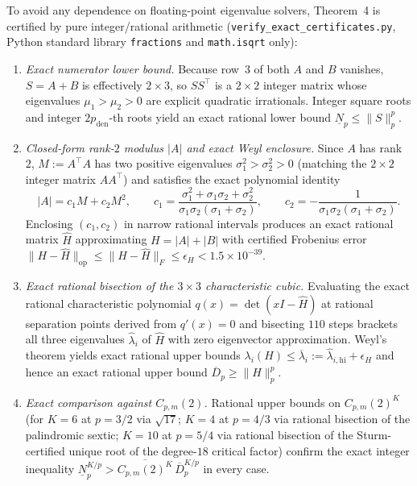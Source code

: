 \documentclass[10pt,letterpaper]{article}
\newcommand{\op}{\mathrm{op}}
\begin{document}
To avoid any dependence on floating-point eigenvalue solvers, Theorem~4 is certified by pure integer/rational arithmetic (\texttt{verify\_exact\_certificates.py}, Python standard library \texttt{fractions} and \texttt{math.isqrt} only):
\begin{enumerate}[leftmargin=1.6em,itemsep=2pt]
  \item \emph{Exact numerator lower bound.} Because row~$3$ of both $A$ and $B$ vanishes, $S = A+B$ is effectively $2\times 3$, so $S S^\top$ is a $2\times 2$ integer matrix whose eigenvalues $\mu_1 > \mu_2 > 0$ are explicit quadratic irrationals. Integer square roots and integer $2p_{\mathrm{den}}$-th roots yield an exact rational lower bound $\underline{N}_p \le \|S\|_p^p$.
  \item \emph{Closed-form rank-$2$ modulus $|A|$ and exact Weyl enclosure.} Since $A$ has rank~$2$, $M := A^\top A$ has two positive eigenvalues $\sigma_1^2 > \sigma_2^2 > 0$ (matching the $2\times 2$ integer matrix $A A^\top$) and satisfies the exact polynomial identity
  \[
    |A| = c_1 M + c_2 M^2, \qquad c_1 = \frac{\sigma_1^2 + \sigma_1\sigma_2 + \sigma_2^2}{\sigma_1\sigma_2(\sigma_1 + \sigma_2)}, \qquad c_2 = -\frac{1}{\sigma_1\sigma_2(\sigma_1 + \sigma_2)}.
  \]
  Enclosing $(c_1, c_2)$ in narrow rational intervals produces an exact rational matrix $\widehat{H}$ approximating $H = |A| + |B|$ with certified Frobenius error $\|H - \widehat{H}\|_{\op} \le \|H - \widehat{H}\|_F \le \epsilon_H < 1.5\times 10^{-39}$.
  \item \emph{Exact rational bisection of the $3\times 3$ characteristic cubic.} Evaluating the exact rational characteristic polynomial $q(x) = \det(xI - \widehat{H})$ at rational separation points derived from $q'(x) = 0$ and bisecting $110$ steps brackets all three eigenvalues $\hat{\lambda}_i$ of $\widehat{H}$ with zero eigenvector approximation. Weyl's theorem yields exact rational upper bounds $\lambda_i(H) \le \overline{\lambda}_i := \hat{\lambda}_{i,\mathrm{hi}} + \epsilon_H$ and hence an exact rational upper bound $\overline{D}_p \ge \|H\|_p^p$.
  \item \emph{Exact comparison against $C_{p,m}(2)$.} Rational upper bounds on $C_{p,m}(2)^K$ (for $K = 6$ at $p = 3/2$ via $\sqrt{17}$; $K = 4$ at $p = 4/3$ via rational bisection of the palindromic sextic; $K = 10$ at $p = 5/4$ via rational bisection of the Sturm-certified unique root of the degree-$18$ critical factor) confirm the exact integer inequality $\underline{N}_p^{K/p} > \overline{C_{p,m}(2)^K}\,\overline{D}_p^{K/p}$ in every case.
\end{enumerate}
\end{document}
